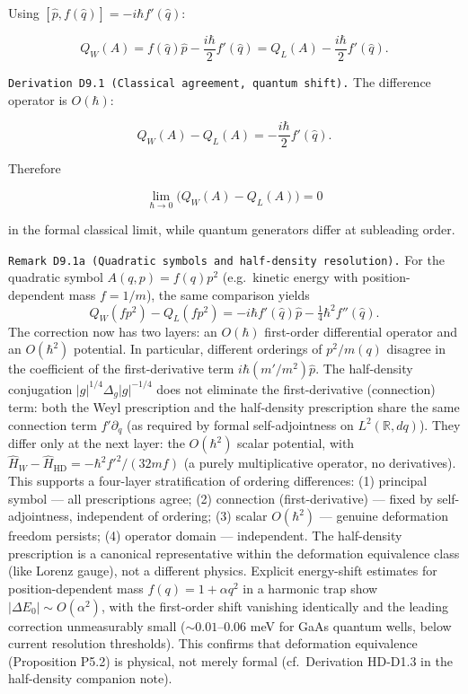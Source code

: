 \documentclass[
]{article}
\begin{document}
Using \([\hat p,f(\hat q)]=-i\hbar f'(\hat q)\):

\[
Q_W(A)
=
f(\hat q)\hat p
-\frac{i\hbar}{2}f'(\hat q)
=
Q_L(A)-\frac{i\hbar}{2}f'(\hat q).
\]

\texttt{Derivation\ D9.1\ (Classical\ agreement,\ quantum\ shift).} The
difference operator is \(O(\hbar)\):

\[
Q_W(A)-Q_L(A)=-\frac{i\hbar}{2}f'(\hat q).
\]

Therefore

\[
\lim_{\hbar\to0}\big(Q_W(A)-Q_L(A)\big)=0
\]

in the formal classical limit, while quantum generators differ at
subleading order.

\texttt{Remark\ D9.1a\ (Quadratic\ symbols\ and\ half-density\ resolution).}
For the quadratic symbol \(A(q,p)=f(q)p^2\) (e.g.~kinetic energy with
position-dependent mass \(f=1/m\)), the same comparison yields \[
Q_W(fp^2)-Q_L(fp^2)=-i\hbar f'(\hat q)\hat p-\tfrac{1}{4}\hbar^2 f''(\hat q).
\] The correction now has two layers: an \(O(\hbar)\) first-order
differential operator and an \(O(\hbar^2)\) potential. In particular,
different orderings of \(p^2/m(q)\) disagree in the coefficient of the
first-derivative term \(i\hbar(m'/m^2)\hat p\). The half-density
conjugation \(|g|^{1/4}\Delta_g|g|^{-1/4}\) does not eliminate the
first-derivative (connection) term: both the Weyl prescription and the
half-density prescription share the same connection term
\(f'\partial_q\) (as required by formal self-adjointness on
\(L^2(\mathbb R,dq)\)). They differ only at the next layer: the
\(O(\hbar^2)\) scalar potential, with
\(\hat H_W-\hat H_{\mathrm{HD}}=-\hbar^2 f'^2/(32mf)\) (a purely
multiplicative operator, no derivatives). This supports a four-layer
stratification of ordering differences: (1) principal symbol --- all
prescriptions agree; (2) connection (first-derivative) --- fixed by
self-adjointness, independent of ordering; (3) scalar \(O(\hbar^2)\) ---
genuine deformation freedom persists; (4) operator domain ---
independent. The half-density prescription is a canonical representative
within the deformation equivalence class (like Lorenz gauge), not a
different physics. Explicit energy-shift estimates for
position-dependent mass \(f(q)=1+\alpha q^2\) in a harmonic trap show
\(|\Delta E_0|\sim O(\alpha^2)\), with the first-order shift vanishing
identically and the leading correction unmeasurably small
(\(\sim 0.01\)--\(0.06\) meV for GaAs quantum wells, below current
resolution thresholds). This confirms that deformation equivalence
(Proposition P5.2) is physical, not merely formal (cf.~Derivation
HD-D1.3 in the half-density companion note).
\end{document}
